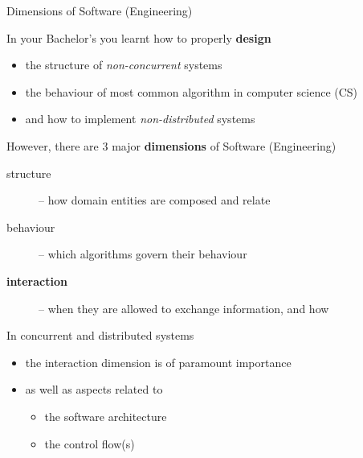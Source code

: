 \documentclass[presentation]{beamer}\mode<presentation>{\usetheme{AMSCesenaPurpleAndGold}}
\begin{document}
\begin{frame}[c,allowframebreaks]{Dimensions of Software (Engineering)}

    \begin{block}{In your Bachelor's you learnt how to properly \textbf{design}}
    	\begin{itemize}
    		\item the \alert{structure} of \emph{non-concurrent} systems
    		\item the \alert{behaviour} of most common algorithm in computer science (CS)
    		\item and how to implement \emph{non-distributed} systems
    	\end{itemize}
    \end{block}

	\framebreak

	\begin{alertblock}{However, there are 3 major \textbf{dimensions} of Software (Engineering)}
		\begin{description}
			\item[structure] -- how domain entities are composed and relate
			\item[behaviour] -- which algorithms govern their behaviour
			\item[\textbf{interaction}] -- when they are allowed to exchange information, and how
		\end{description}
	\end{alertblock}

	\framebreak

	\begin{exampleblock}{In concurrent and distributed systems}
		\begin{itemize}
			\item the interaction dimension is of paramount importance
			\item as well as aspects related to
			\begin{itemize}
				\item the \alert{software architecture}
				\item the \alert{control flow(s)}
			\end{itemize}
		\end{itemize}
	\end{exampleblock}

	\bigskip


\end{frame}
\end{document}
